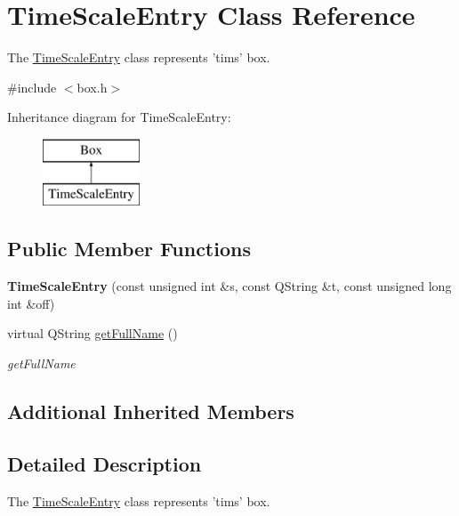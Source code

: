 \hypertarget{class_time_scale_entry}{\section{Time\-Scale\-Entry Class Reference}
\label{class_time_scale_entry}
}


The \hyperlink{class_time_scale_entry}{Time\-Scale\-Entry} class represents 'tims' box.  




{\ttfamily \#include $<$box.\-h$>$}

Inheritance diagram for Time\-Scale\-Entry\-:\begin{figure}[H]
\begin{center}
\leavevmode
\includegraphics[height=2.000000cm]{class_time_scale_entry}
\end{center}
\end{figure}
\subsection*{Public Member Functions}
\begin{DoxyCompactItemize}
\item 
\hypertarget{class_time_scale_entry_ac9418b3ef93f9f3a952b765840fe27d0}{{\bfseries Time\-Scale\-Entry} (const unsigned int \&s, const Q\-String \&t, const unsigned long int \&off)}\label{class_time_scale_entry_ac9418b3ef93f9f3a952b765840fe27d0}

\item 
virtual Q\-String \hyperlink{class_time_scale_entry_a0a6cd5076e6fd5a2ef2250985a602fd2}{get\-Full\-Name} ()
\begin{DoxyCompactList}\small\item\em get\-Full\-Name \end{DoxyCompactList}\end{DoxyCompactItemize}
\subsection*{Additional Inherited Members}


\subsection{Detailed Description}
The \hyperlink{class_time_scale_entry}{Time\-Scale\-Entry} class represents 'tims' box. 

